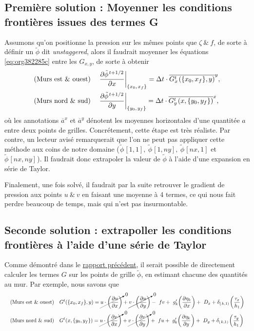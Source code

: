 \documentclass[10pt]{article}
\numberwithin{equation}{section}
\newcommand{\pt}{\hspace{1pt}} %
\newcommand{\xmean}[1]{\overline{#1}^x}
\newcommand{\ymean}[1]{\overline{#1}^y}
\begin{document}
\subsection{Première solution : Moyenner les conditions frontières issues des termes G}
\label{sec:org9542f1b}

Assumons qu'on positionne la pression sur les mêmes points que \(\zeta\ \& \ f\), de sorte à définir un \(\tilde{\phi}\) dit \emph{unstaggered}, alors il faudrait moyenner les équations \ref{eq:org382285c} entre les \(G_{x,y}\), de sorte à obtenir
\begin{subequations}
\label{eq:orgcd1abf6}
\begin{align}
&& &\text{(Murs est \& ouest)}
&&\eval{\pdv{\tilde{\phi}^{\pt t+1/2}}{x}}_\qty{x_0,\pt x_f}
= \Delta t\cdot \ymean{G^t_x\pt (\{x_0,x_f\},y)},&&\\
&& &\text{(Murs nord \& sud)}
&&\eval{\pdv{\tilde{\phi}^{\pt t+1/2}}{y}}_\qty{y_0,\pt y_f}
=  \Delta t\cdot \xmean{G^t_y\pt (x,\{y_0,y_f\})},&&
\end{align}
\end{subequations}
où les annotations \(\xmean{a}\) et \(\ymean{a}\) dénotent les moyennes horizontales d'une quantitée \(a\) entre deux points de grilles.
Concrétement, cette étape est très réaliste.
Par contre, un lecteur avisé remarquerait que l'on ne peut pas appliquer cette méthode aux coins de notre domaine (\(\pt \tilde{\phi}\pt[1,1],\ \tilde{\phi}\pt[1,ny],\ \tilde{\phi}\pt[nx,1]\) et \(\tilde{\phi}\pt[nx,ny]\pt\)).
Il faudrait donc extrapoler la valeur de \(\tilde{\phi}\) à l'aide d'une expansion en série de Taylor.\bigskip

Finalement, une fois solvé, il faudrait par la suite retrouver le gradient de pression aux points \(u\ \&\ v\) en faisant une moyenne à 4 termes, ce qui nous fait perdre beaucoup de temps, mais qui n'est pas insurmontable.
\subsection{Seconde solution : extrapoller les conditions frontières à l'aide d'une série de Taylor}
\label{sec:org18de3cf}
Comme démontré dans le \href{rapport-2023-04-21.org}{rapport précédent}, il serait possible de directement calculer les termes \(G\) sur les points de grille \(\tilde{\phi}\), en estimant chacune des quantités au mur.
Par exemple, nous savons que 
\begin{subequations}
\begin{align}
&& &\text{(Murs est \& ouest)}&&
G^t(\{x_0,x_f\},y) =
\cancelto{0}{u \cdot \qty(\pdv{u}{x})} + \cancelto{0}{v \cdot \qty(\pdv{u}{y})}
-\ fv
+\ g'_{k} \qty(\pdv{\eta_k}{x})
+\ D_x
+\delta_\qty(\pt k,1)\pt \qty(\frac{\tau_x}{h_1})&&\\
%
&& &\text{(Murs nord \& sud)} &&
G^t(x,\{y_0,y_f\}) =
\cancelto{0}{u \cdot \qty(\pdv{v}{x})} + \cancelto{0}{v \cdot \qty(\pdv{v}{y})}
+\ fu
+\ g'_{k} \qty(\pdv{\eta_k}{y})
+\ D_y
+\delta_\qty(\pt k,1)\pt \qty(\frac{\tau_y}{h_1})&&
\end{align}
\end{subequations}
\end{document}
